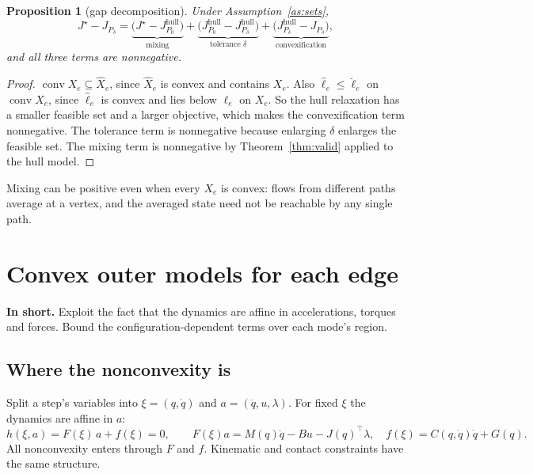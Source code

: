 \documentclass[11pt]{article}
\newcommand{\Jd}{J_{P_\delta}}
\newcommand{\conv}{\operatorname{conv}}
\newcommand{\inshort}[1]{\par\noindent\textcolor{accent}{\textbf{In short.}} #1\par\smallskip}
\theoremstyle{plain}
\newtheorem{proposition}[theorem]{Proposition}
\theoremstyle{definition}
\theoremstyle{remark}
\begin{document}
\begin{proposition}[gap decomposition]\label{prop:gapdec}
Under Assumption~\ref{as:sets},
\[
J^\star-\Jd=\underbrace{\big(J^\star-J^{\mathrm{hull}}_{P_0}\big)}_{\text{mixing}}+\underbrace{\big(J^{\mathrm{hull}}_{P_0}-J^{\mathrm{hull}}_{P_\delta}\big)}_{\text{tolerance }\delta}+\underbrace{\big(J^{\mathrm{hull}}_{P_\delta}-\Jd\big)}_{\text{convexification}},
\]
and all three terms are nonnegative.
\end{proposition}
\begin{proof}
$\conv X_e\subseteq\hat X_e$, since $\hat X_e$ is convex and contains $X_e$. Also $\hat\ell_e\le\breve\ell_e$ on $\conv X_e$, since $\hat\ell_e$ is convex and lies below $\ell_e$ on $X_e$. So the hull relaxation has a smaller feasible set and a larger objective, which makes the convexification term nonnegative. The tolerance term is nonnegative because enlarging $\delta$ enlarges the feasible set. The mixing term is nonnegative by Theorem~\ref{thm:valid} applied to the hull model.
\end{proof}
Mixing can be positive even when every $X_e$ is convex: flows from different paths average at a vertex, and the averaged state need not be reachable by any single path.

\section{Convex outer models for each edge}\label{sec:outer}
\inshort{Exploit the fact that the dynamics are affine in accelerations, torques and forces. Bound the configuration-dependent terms over each mode's region.}

\subsection{Where the nonconvexity is}
Split a step's variables into $\xi=(q,\dot q)$ and $a=(\ddot q,u,\lambda)$. For fixed $\xi$ the dynamics are affine in $a$:
\[
h(\xi,a)=F(\xi)\,a+f(\xi)=0,\qquad F(\xi)a=M(q)\ddot q-Bu-J(q)^\top\lambda,\quad f(\xi)=C(q,\dot q)\dot q+G(q).
\]
All nonconvexity enters through $F$ and $f$. Kinematic and contact constraints have the same structure.
\end{document}
